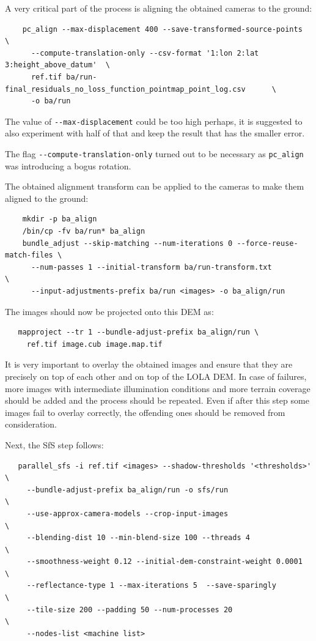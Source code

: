 A very critical part of the process is aligning the obtained cameras to the ground:

\begin{verbatim}
    pc_align --max-displacement 400 --save-transformed-source-points              \
      --compute-translation-only --csv-format '1:lon 2:lat 3:height_above_datum'  \
      ref.tif ba/run-final_residuals_no_loss_function_pointmap_point_log.csv      \
      -o ba/run 
\end{verbatim}

The value of \texttt{-\/-max-displacement} could be too high perhaps, it
is suggested to also experiment with half of that and keep the result
that has the smaller error.

The flag \texttt{-\/-compute-translation-only} turned out to be
necessary as \texttt{pc\_align} was introducing a bogus rotation. 

The obtained alignment transform can be applied to the cameras to make them aligned
to the ground:

\begin{verbatim}
    mkdir -p ba_align
    /bin/cp -fv ba/run* ba_align
    bundle_adjust --skip-matching --num-iterations 0 --force-reuse-match-files \
      --num-passes 1 --initial-transform ba/run-transform.txt                  \
      --input-adjustments-prefix ba/run <images> -o ba_align/run
\end{verbatim}

The images should now be projected onto this DEM as:

\begin{verbatim}
   mapproject --tr 1 --bundle-adjust-prefix ba_align/run \
     ref.tif image.cub image.map.tif
\end{verbatim}

It is very important to overlay the obtained images and ensure that they
are precisely on top of each other and on top of the LOLA DEM. In case
of failures, more images with intermediate illumination conditions and
more terrain coverage should be added and the process should be
repeated. Even if after this step some images fail to overlay correctly,
the offending ones should be removed from consideration.

Next, the SfS step follows:

\begin{verbatim}
   parallel_sfs -i ref.tif <images> --shadow-thresholds '<thresholds>'  \
     --bundle-adjust-prefix ba_align/run -o sfs/run                     \ 
     --use-approx-camera-models --crop-input-images                     \
     --blending-dist 10 --min-blend-size 100 --threads 4                \
     --smoothness-weight 0.12 --initial-dem-constraint-weight 0.0001    \
     --reflectance-type 1 --max-iterations 5  --save-sparingly          \
     --tile-size 200 --padding 50 --num-processes 20                    \
     --nodes-list <machine list>
\end{verbatim}

